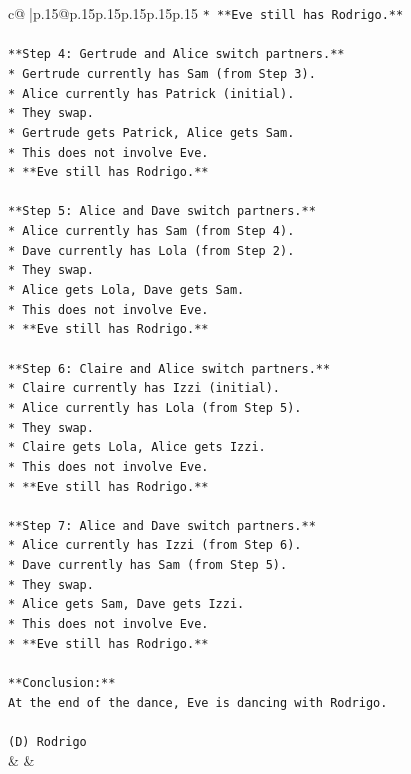 \documentclass{article}
\begin{document}
{\begin{supertabular}{c@{$\;$}|p{.15\linewidth}@{}p{.15\linewidth}p{.15\linewidth}p{.15\linewidth}p{.15\linewidth}p{.15\linewidth}}
{{{\texttt{*   **Eve still has Rodrigo.**} \\
\\ 
\texttt{**Step 4: Gertrude and Alice switch partners.**} \\
\texttt{*   Gertrude currently has Sam (from Step 3).} \\
\texttt{*   Alice currently has Patrick (initial).} \\
\texttt{*   They swap.} \\
\texttt{*   Gertrude gets Patrick, Alice gets Sam.} \\
\texttt{*   This does not involve Eve.} \\
\texttt{*   **Eve still has Rodrigo.**} \\
\\ 
\texttt{**Step 5: Alice and Dave switch partners.**} \\
\texttt{*   Alice currently has Sam (from Step 4).} \\
\texttt{*   Dave currently has Lola (from Step 2).} \\
\texttt{*   They swap.} \\
\texttt{*   Alice gets Lola, Dave gets Sam.} \\
\texttt{*   This does not involve Eve.} \\
\texttt{*   **Eve still has Rodrigo.**} \\
\\ 
\texttt{**Step 6: Claire and Alice switch partners.**} \\
\texttt{*   Claire currently has Izzi (initial).} \\
\texttt{*   Alice currently has Lola (from Step 5).} \\
\texttt{*   They swap.} \\
\texttt{*   Claire gets Lola, Alice gets Izzi.} \\
\texttt{*   This does not involve Eve.} \\
\texttt{*   **Eve still has Rodrigo.**} \\
\\ 
\texttt{**Step 7: Alice and Dave switch partners.**} \\
\texttt{*   Alice currently has Izzi (from Step 6).} \\
\texttt{*   Dave currently has Sam (from Step 5).} \\
\texttt{*   They swap.} \\
\texttt{*   Alice gets Sam, Dave gets Izzi.} \\
\texttt{*   This does not involve Eve.} \\
\texttt{*   **Eve still has Rodrigo.**} \\
\\ 
\texttt{**Conclusion:**} \\
\texttt{At the end of the dance, Eve is dancing with Rodrigo.} \\
\\ 
\texttt{(D) Rodrigo} \\
            }
        }
    }
    & & \\ \\


\end{supertabular}}
\end{document}
